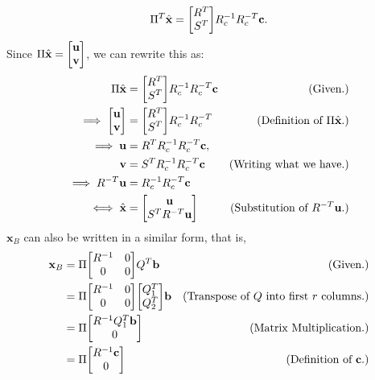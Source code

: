 \begin{solution}
\[
\Pi^T\hat{\textbf{x}} =  \mqty[R^T\\S^T]R^\inv _c R^{-T}_c\textbf{c}.
\]
Since $\Pi\hat{\textbf{x}} = \mqty[\textbf{u} \\\textbf{v}]$, we can rewrite this as:
\alignbreak
\begin{align*}
    \Pi\hat{\textbf{x}} &= \mqty[R^T\\S^T]R_c^\inv R_c^{-T}\textbf{c} &\text{(Given.)}\\
    \implies \mqty[\textbf{u}\\\textbf{v}] &= \mqty[R^T\\S^T]R_c^\inv R_c^{-T} &\text{(Definition of $\Pi \hat{\textbf{x}}.)$}\\
    \implies \textbf{u} &= R^TR^\inv _c R^{-T}_c \textbf{c},\\ 
     \textbf{v} &= S^TR^\inv _c R^{-T}_c\textbf{c} &\text{(Writing what we have.)}\\ 
     \implies R^{-T}\textbf{u} &= R^\inv _c R^{-T}_c \textbf{c}\\
     \iff \hat{\textbf{x}} &= \mqty[\textbf{u}\\S^TR^{-T}\textbf{u}] &\text{(Substitution of $R^{-T}\textbf{u}$.)}
\end{align*}
\alignbreak
\newpage
$\textbf{x}_B$ can also be written in a similar form, that is, 
\alignbreak
\begin{align*}
    \textbf{x}_B &= \Pi\mqty[R^\inv &0\\0&0]Q^T\textbf{b} &\text{(Given.)}\\
    &= \Pi\mqty[R^\inv &0\\0&0]\mqty[Q_1^T\\Q_2^T]\textbf{b} &\text{(Transpose of $Q$ into first $r$ columns.)}\\
    &= \Pi \mqty[R^\inv Q_1^T\textbf{b}\\0] &\text{(Matrix Multiplication.)}\\
    &= \Pi\mqty[R^\inv \textbf{c}\\0] &\text{(Definition of $\textbf{c}$.)}
\end{align*}
\alignbreak


\end{solution}
